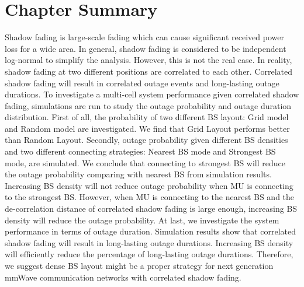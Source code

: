  \section{Chapter Summary}
 \label{4:Conclusion}
 Shadow fading is large-scale fading which can cause significant received power loss for a wide area. In general, shadow fading is considered to be independent log-normal to simplify the analysis. However, this is not the real case. In reality, shadow fading at two different positions are correlated to each other. Correlated shadow fading will result in correlated outage events and long-lasting outage durations. To investigate a multi-cell system performance given correlated shadow fading, simulations are run to study the outage probability and outage duration distribution. First of all, the probability of two different BS layout: Grid model and Random model are investigated. We find that Grid Layout performs better than Random Layout. Secondly, outage probability given different BS densities and two different connecting strategies: Nearest BS mode and Strongest BS mode, are simulated. We conclude that connecting to strongest BS will reduce the outage probability comparing with nearest BS from simulation results. Increasing BS density will not reduce outage probability when MU is connecting to the strongest BS. However, when MU is connecting to the nearest BS and the de-correlation distance of correlated shadow fading is large enough, increasing BS density will reduce the outage probability.  At last, we investigate the system performance in terms of outage duration. Simulation results show that correlated shadow fading will result in long-lasting outage durations. Increasing BS density will efficiently reduce the percentage of long-lasting outage durations. Therefore, we suggest dense BS layout might be a proper strategy for next generation mmWave communication networks with correlated shadow fading.
 

